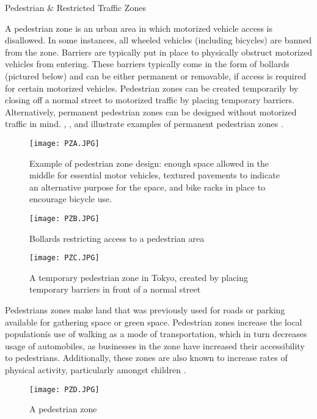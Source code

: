 Pedestrian & Restricted Traffic Zones

A pedestrian zone is an urban area in which motorized vehicle access is disallowed. In some instances, all wheeled vehicles (including bicycles) are banned from the zone. Barriers are typically put in place to physically obstruct motorized vehicles from entering. These barriers typically come in the form of bollards (pictured below) and can be either permanent or removable, if access is required for certain motorized vehicles. Pedestrian zones can be created temporarily by closing off a normal street to motorized traffic by placing temporary barriers. Alternatively, permanent pedestrian zones can be designed without motorized traffic in mind. , , and  illustrate examples of permanent pedestrian zones \cite{PZ4}.
 
\begin{figure}[h]
\centering
\texttt{[image: PZA.JPG]}
\caption[Example of pedestrian zone design]{Example of pedestrian zone design: enough space allowed in the middle for essential motor vehicles, textured pavements to indicate an alternative purpose for the space, and bike racks in place to encourage bicycle use.}\label{fig:PZA}
\end{figure}

\begin{figure}[h]
\centering
\texttt{[image: PZB.JPG]}
\caption[Bollards restricting access to a pedestrian area]{Bollards restricting access to a pedestrian area}\label{fig:PZB}
\end{figure}

\begin{figure}[h]
\centering
\texttt{[image: PZC.JPG]}
\caption[A temporary pedestrian zone in Tokyo]{A temporary pedestrian zone in Tokyo, created by placing temporary barriers in front of a normal street}\label{fig:PZC}
\end{figure}

Pedestrians zones make land that was previously used for roads or parking available for gathering space or green space. Pedestrian zones increase the local populationís use of walking as a mode of transportation, which in turn decreases usage of automobiles, as businesses in the zone have increased their accessibility to pedestrians. Additionally, these zones are also known to increase rates of physical activity, particularly amongst children \cite{PZ4}.
 
\begin{figure}[h]
\centering
\texttt{[image: PZD.JPG]}
\caption[A pedestrian zone]{A pedestrian zone}\label{fig:PZD}
\end{figure}


